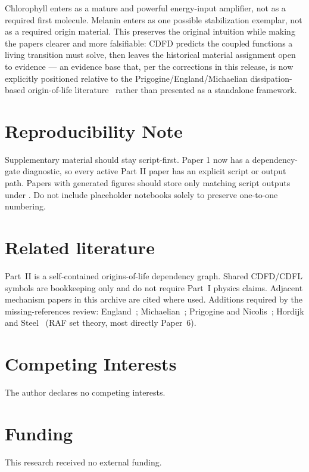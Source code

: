 \documentclass[11pt,a4paper]{article}
\begin{document}
Chlorophyll enters as a mature and powerful energy-input amplifier, not as a required first molecule. Melanin enters as one possible stabilization exemplar, not as a required origin material. This preserves the original intuition while making the papers clearer and more falsifiable: CDFD predicts the coupled functions a living transition must solve, then leaves the historical material assignment open to evidence --- an evidence base that, per the corrections in this release, is now explicitly positioned relative to the Prigogine/England/Michaelian dissipation-based origin-of-life literature~\cite{PrigogineNicolis1977,England2013,Michaelian2011,Michaelian2017} rather than presented as a standalone framework.

\section{Reproducibility Note}

Supplementary material should stay script-first. Paper 1 now has a
dependency-gate diagnostic, so every active Part II paper has an explicit script
or output path. Papers with generated figures should store only matching script
outputs under . Do not include placeholder notebooks
solely to preserve one-to-one numbering.

\section*{Related literature}
Part~II is a self-contained origins-of-life dependency graph. Shared CDFD/CDFL symbols are bookkeeping only and do not require Part~I physics claims. Adjacent mechanism papers in this archive are cited where used. Additions required by the missing-references review: England~\cite{England2013}; Michaelian~\cite{Michaelian2011,Michaelian2017}; Prigogine and Nicolis~\cite{PrigogineNicolis1977}; Hordijk and Steel~\cite{HordijkSteel2004} (RAF set theory, most directly Paper~6).

\section*{Competing Interests}
The author declares no competing interests.

\section*{Funding}
This research received no external funding.
\end{document}
